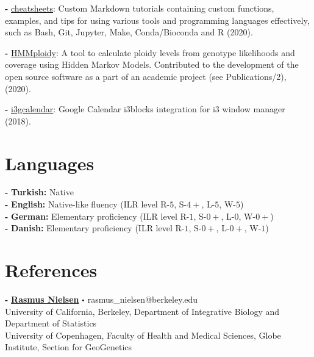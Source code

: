 \documentclass[letterpaper,10.5pt]{article}
\newcommand\sbullet[1][.5]{\mathbin{\vcenter{\hbox{\scalebox{#1}{$\bullet$}}}}}
\begin{document}
\textbf{-}  \href{https://github.com/isinaltinkaya/cheatsheets}{cheatsheets}: Custom Markdown tutorials containing custom functions, examples, and tips for using various tools and programming languages effectively, such as Bash, Git, Jupyter, Make, Conda/Bioconda and R (2020). \\
\smallskip

\textbf{-}  \href{https://github.com/SamueleSoraggi/HMMploidy}{HMMploidy}: A tool to calculate ploidy levels from genotype likelihoods and coverage using Hidden Markov Models. Contributed to the development of the open source software as a part of an academic project (see Publications/2), (2020).\\
\smallskip

\textbf{-}  \href{https://github.com/isinaltinkaya/i3gcalendar}{i3gcalendar}: Google Calendar i3blocks integration for i3 window manager (2018). \\
\smallskip


\section{Languages}
    \textbf{-}  \textbf{Turkish:} Native \\
    \textbf{-}  \textbf{English:} Native-like fluency (ILR level R-$5$, S-$4+$, L-$5$, W-$5$) \\
    \textbf{-}  \textbf{German:} Elementary proficiency (ILR level R-$1$, S-$0+$, L-$0$, W-$0+$) \\
    \textbf{-}  \textbf{Danish:} Elementary proficiency (ILR level R-$1$, S-$0+$, L-$0+$, W-$1$) \\


\section{References}

\textbf{-} \textbf{\href{https://scholar.google.com/citations?user=PySbfcEAAAAJ&hl=en&oi=ao}{Rasmus Nielsen}}  $\sbullet[.5]$ rasmus\_nielsen@berkeley.edu \\
University of California, Berkeley, Department of Integrative Biology and Department of Statistics \\
University of Copenhagen, Faculty of Health and Medical Sciences, Globe Institute, Section for GeoGenetics \\
\end{document}
